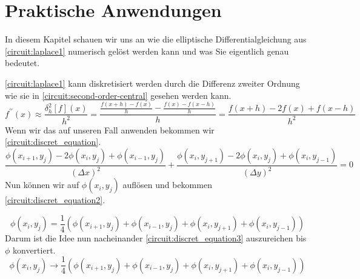 \section{Praktische Anwendungen}
In diesem Kapitel schauen wir uns an wie die elliptische Differentialgleichung aus \autoref{circuit:laplace1} numerisch gelöst werden kann und was Sie eigentlich genau bedeutet.

\autoref{circuit:laplace1} kann diskretisiert werden durch die Differenz zweiter Ordnung wie sie in \autoref{circuit:second-order-central} \cite{enwiki:1220817436} gesehen werden kann.
\begin{equation}
	f^{\prime \prime}(x) \approx \frac{\delta_h^2[f](x)}{h^2}=\frac{\frac{f(x+h)-f(x)}{h}-\frac{f(x)-f(x-h)}{h}}{h}=\frac{f(x+h)-2 f(x)+f(x-h)}{h^2}
	\label{circuit:second-order-central}
\end{equation}
Wenn wir das auf unseren Fall anwenden bekommen wir \autoref{circuit:discret_equation}.
\begin{equation}
	\frac{\phi(x_{i+1}, y_j) - 2\phi(x_i, y_j) + \phi(x_{i-1}, y_j)}{(\Delta x)^2} + \frac{\phi(x_i, y_{j+1}) - 2\phi(x_i, y_j) + \phi(x_i, y_{j-1})}{(\Delta y)^2} = 0 
	\label{circuit:discret_equation}
\end{equation}
Nun können wir auf $\phi(x_i, y_j)$ auflösen und bekommen \autoref{circuit:discret_equation2}.

\begin{equation}
	\phi(x_i, y_j) = \frac{1}{4}(\phi(x_{i+1}, y_{j}) + \phi(x_{i-1}, y_{j}) + \phi(x_{i}, y_{j+1}) + \phi(x_{i}, y_{j-1}))
	\label{circuit:discret_equation2}
\end{equation}
Darum ist die Idee nun nacheinander \autoref{circuit:discret_equation3} auszureichen bis $\phi$ konvertiert.
\begin{equation}
	\phi(x_i, y_j) \to \frac{1}{4}(\phi(x_{i+1}, y_{j}) + \phi(x_{i-1}, y_{j}) + \phi(x_{i}, y_{j+1}) + \phi(x_{i}, y_{j-1}))
	\label{circuit:discret_equation3}
\end{equation}
